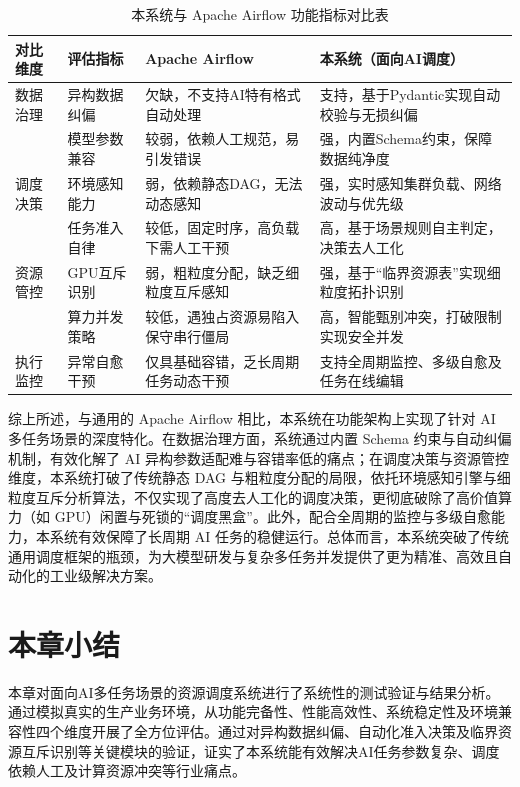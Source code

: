 \begin{table}[htbp]
\centering
\caption{本系统与 Apache Airflow 功能指标对比表}
\begin{tabularx}{\textwidth}{llXX}
\toprule
\textbf{对比维度} & \textbf{评估指标} & \textbf{Apache Airflow} & \textbf{本系统（面向AI调度）} \\
\midrule
数据治理 & 异构数据纠偏 & 欠缺，不支持AI特有格式自动处理 & 支持，基于Pydantic实现自动校验与无损纠偏 \\
         & 模型参数兼容 & 较弱，依赖人工规范，易引发错误 & 强，内置Schema约束，保障数据纯净度 \\
\midrule
调度决策 & 环境感知能力 & 弱，依赖静态DAG，无法动态感知 & 强，实时感知集群负载、网络波动与优先级 \\
         & 任务准入自律 & 较低，固定时序，高负载下需人工干预 & 高，基于场景规则自主判定，决策去人工化 \\
\midrule
资源管控 & GPU互斥识别  & 弱，粗粒度分配，缺乏细粒度互斥感知 & 强，基于“临界资源表”实现细粒度拓扑识别 \\
         & 算力并发策略 & 较低，遇独占资源易陷入保守串行僵局 & 高，智能甄别冲突，打破限制实现安全并发 \\
\midrule
执行监控 & 异常自愈干预 & 仅具基础容错，乏长周期任务动态干预 & 支持全周期监控、多级自愈及任务在线编辑 \\
\bottomrule
\end{tabularx}
\label{tab:functional_metrics_comparison}
\end{table}

综上所述，与通用的 Apache Airflow 相比，本系统在功能架构上实现了针对 AI 多任务场景的深度特化。在数据治理方面，系统通过内置 Schema 约束与自动纠偏机制，有效化解了 AI 异构参数适配难与容错率低的痛点；在调度决策与资源管控维度，本系统打破了传统静态 DAG 与粗粒度分配的局限，依托环境感知引擎与细粒度互斥分析算法，不仅实现了高度去人工化的调度决策，更彻底破除了高价值算力（如 GPU）闲置与死锁的“调度黑盒”。此外，配合全周期的监控与多级自愈能力，本系统有效保障了长周期 AI 任务的稳健运行。总体而言，本系统突破了传统通用调度框架的瓶颈，为大模型研发与复杂多任务并发提供了更为精准、高效且自动化的工业级解决方案。

\section{本章小结}

本章对面向AI多任务场景的资源调度系统进行了系统性的测试验证与结果分析。通过模拟真实的生产业务环境，从功能完备性、性能高效性、系统稳定性及环境兼容性四个维度开展了全方位评估。通过对异构数据纠偏、自动化准入决策及临界资源互斥识别等关键模块的验证，证实了本系统能有效解决AI任务参数复杂、调度依赖人工及计算资源冲突等行业痛点。

\makeatletter
\@openrightfalse
\makeatother